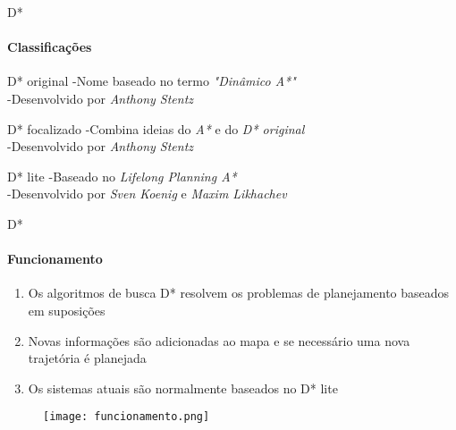 \begin{frame}[t]{D*}
    \framesubtitle{Classificações}

    \begin{block}{D* original}
        -Nome baseado no termo \emph{"Dinâmico A*"}\\
        -Desenvolvido por \emph{Anthony Stentz}
    \end{block}

    \begin{alertblock}{D* focalizado}
        -Combina ideias do \emph{A*} e do \emph{D* original}\\
        -Desenvolvido por \emph{Anthony Stentz}
    \end{alertblock}

    \begin{exampleblock}{D* lite}
        -Baseado no \emph{Lifelong Planning A*}\\
        -Desenvolvido por \emph{Sven Koenig} e \emph{Maxim Likhachev} 
    \end{exampleblock}
\end{frame}
\begin{frame}[t]{D*}
    \framesubtitle{Funcionamento}
    \begin{enumerate}
        \item Os algoritmos de busca D* resolvem os problemas de planejamento baseados em suposições
        \item Novas informações são adicionadas ao mapa e se necessário uma nova trajetória é planejada
        \item Os sistemas atuais são normalmente baseados no D* lite
    \end{enumerate}

    \begin{figure}
        \texttt{[image: funcionamento.png]}
    \end{figure}
\end{frame}
